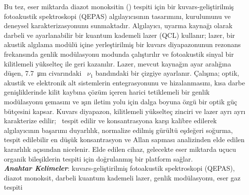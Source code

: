 \noindent
Bu tez, eser miktarda diazot monoksitin (\nto) tespiti için bir kuvars-geliştirilmiş fotoakustik spektroskopi (QEPAS) algılayıcısının tasarımını, kurulumunu ve deneysel karakterizasyonunu sunmaktadır. Algılayıcı, uyarma kaynağı olarak darbeli ve ayarlanabilir bir kuantum kademeli lazer (QCL) kullanır; lazer, bir akustik algılama modülü içine yerleştirilmiş bir kuvars diyapazonunun rezonans frekansında genlik modülasyonu modunda çalıştırılır ve fotoakustik sinyal bir kilitlemeli yükselteç ile geri kazanılır. Lazer, mevcut kaynağın ayar aralığına düşen, \SI{7.7}{\micro\meter} civarındaki \nto\ $\nu_1$ bandındaki bir çizgiye ayarlanır. Çalışma; optik, akustik ve elektronik alt sistemlerin entegrasyonunu ve hizalanmasını, kısa darbe genişliklerinde kilit kaybına çözüm içeren harici tetiklemeli bir genlik modülasyonu şemasını ve ışın iletim yolu için dalga boyuna özgü bir optik güç bütçesini kapsar. Kuvars diyapazon, kilitlemeli yükselteç zinciri ve lazer ayrı ayrı karakterize edilir; \nto\ tespit edilir ve konsantrasyona karşı kalibre edilerek algılayıcının başarımı duyarlılık, normalize edilmiş gürültü eşdeğeri soğurma, tespit edilebilir en düşük konsantrasyon ve Allan sapması analizinden elde edilen kararlılık açısından nicelenir.  Elde edilen cihaz, gelecekte eser miktarda uçucu organik bileşiklerin tespiti için doğrulanmış bir platform sağlar.
\\

\noindent
\textbf{\textit{Anahtar Kelimeler}}: kuvars-geliştirilmiş fotoakustik spektroskopi (QEPAS), diazot monoksit, darbeli kuantum kademeli lazer, genlik modülasyonu, eser gaz tespiti
